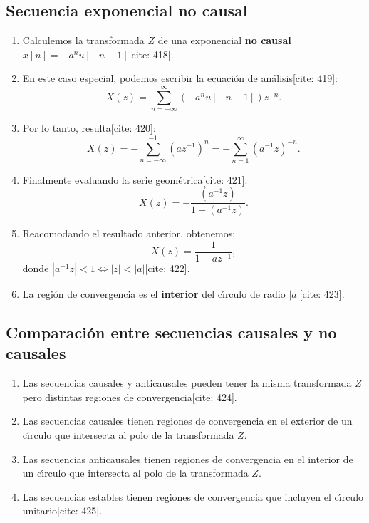 \subsection{Secuencia exponencial no causal}
\begin{enumerate}
	\item Calculemos la transformada $Z$ de una exponencial \textbf{no causal} $x[n] = -a^{n} u[-n-1]$[cite: 418].
	\item En este caso especial, podemos escribir la ecuación de análisis[cite: 419]:
	\begin{equation}
		X(z) = \sum_{n=-\infty}^{\infty} \left( -a^{n} u[-n-1] \right) z^{-n}.
	\end{equation}
	\item Por lo tanto, resulta[cite: 420]:
	\begin{equation}
		X(z) = -\sum_{n=-\infty}^{-1} (a z^{-1})^{n} = -\sum_{n=1}^{\infty} (a^{-1} z)^{-n}.
	\end{equation}
	\item Finalmente evaluando la serie geométrica[cite: 421]:
	\begin{equation}
		X(z) = -\frac{(a^{-1} z)}{1-(a^{-1} z)}.
	\end{equation}
	\item Reacomodando el resultado anterior, obtenemos:
	\begin{equation}
		X(z) = \frac{1}{1-a z^{-1}},
	\end{equation}
	donde $|a^{-1} z| < 1 \Leftrightarrow |z| < |a|$[cite: 422].
	\item La regi\'{o}n de convergencia es el \textbf{interior} del c\'{\i}rculo de radio $|a|$[cite: 423].
\end{enumerate}

\subsection{Comparaci\'{o}n entre secuencias causales y no causales}
\begin{enumerate}
	\item Las secuencias causales y anticausales pueden tener la misma transformada $Z$ pero distintas regiones de convergencia[cite: 424].
	\item Las secuencias causales tienen regiones de convergencia en el exterior de un c\'{\i}rculo que intersecta al polo de la transformada $Z$.
	\item Las secuencias anticausales tienen regiones de convergencia en el interior de un c\'{\i}rculo que intersecta al polo de la transformada $Z$.
	\item Las secuencias estables tienen regiones de convergencia que incluyen el c\'{\i}rculo unitario[cite: 425].
\end{enumerate}


